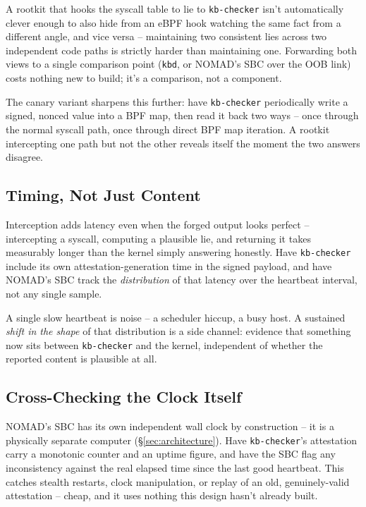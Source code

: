 \documentclass[11pt,a4paper]{article}
\begin{document}
A rootkit that hooks the syscall table to lie to \texttt{kb-checker}
isn't automatically clever enough to also hide from an eBPF hook
watching the same fact from a different angle, and vice versa --
maintaining two consistent lies across two independent code paths is
strictly harder than maintaining one. Forwarding both views to a
single comparison point (\texttt{kbd}, or NOMAD's SBC over the OOB link)
costs nothing new to build; it's a comparison, not a component.

The canary variant sharpens this further: have \texttt{kb-checker}
periodically write a signed, nonced value into a BPF map, then read it
back two ways -- once through the normal syscall path, once through
direct BPF map iteration. A rootkit intercepting one path but not the
other reveals itself the moment the two answers disagree.

\subsection{Timing, Not Just Content}
\label{sec:timing}

Interception adds latency even when the forged output looks perfect --
intercepting a syscall, computing a plausible lie, and returning it
takes measurably longer than the kernel simply answering honestly.
Have \texttt{kb-checker} include its own attestation-generation time
in the signed payload, and have NOMAD's SBC track the \emph{distribution}
of that latency over the heartbeat interval, not any single sample.

\begin{plainbox}
A single slow heartbeat is noise -- a scheduler hiccup, a busy host.
A sustained \emph{shift in the shape} of that distribution is a side
channel: evidence that something now sits between \texttt{kb-checker}
and the kernel, independent of whether the reported content is
plausible at all.
\end{plainbox}

\subsection{Cross-Checking the Clock Itself}
\label{sec:clock-crosscheck}

NOMAD's SBC has its own independent wall clock by construction -- it is
a physically separate computer (\S\ref{sec:architecture}). Have
\texttt{kb-checker}'s attestation carry a monotonic counter and an
uptime figure, and have the SBC flag any inconsistency against the
real elapsed time since the last good heartbeat. This catches stealth
restarts, clock manipulation, or replay of an old, genuinely-valid
attestation -- cheap, and it uses nothing this design hasn't already
built.
\end{document}
